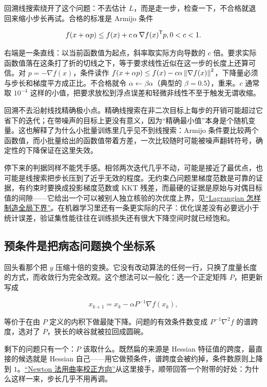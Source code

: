 回溯线搜索绕开了这个问题：不去估计 \(L\)，而是走一步，检查一下，不合格就退回来缩小步长再试。合格的标准是 Armijo 条件

\[
f(x+\alpha p)\le f(x)+c\,\alpha\,\nabla f(x)^{\mathsf{T}}p,
\space 0<c<1 .
\]

右端是一条直线：以当前函数值为起点，斜率取实际方向导数的 \(c\) 倍。要求实际函数值落在这条打了折的切线之下，等于要求线性近似在这一步的长度上还算可信。对 \(p=-\nabla f(x)\)，条件读作 \(f(x+\alpha p)\le f(x)-c\alpha\left\lVert\nabla f(x)\right\rVert^2\)，下降量必须与步长和梯度平方成正比。不合格就令 \(\alpha\leftarrow\beta\alpha\)（典型的 \(\beta=0.5\)），重来。\(c\) 通常取 \(10^{-4}\) 这样的小值，把要求放松到浮点误差和轻微非线性不至于触发无谓收缩。

回溯不去沿射线找精确极小点。精确线搜索在非二次目标上每步的开销可能超过它省下的迭代；在带噪声的目标上更没有意义，因为``精确最小值''本身是个随机变量。这也解释了为什么小批量训练里几乎见不到线搜索：Armijo 条件要比较两个函数值，而小批量给出的函数值带着方差，一次比较随时可能被噪声翻转符号，确定性的下降保证在这里失效。

停下来的判据同样不能凭手感。相邻两次迭代几乎不动，可能是接近了最优点，也可能是线搜索把步长压到了近乎无效的程度。无约束凸问题里梯度范数是可靠的证据，有约束时要换成投影梯度范数或 KKT 残差，而最硬的证据是原始与对偶目标值的间隙——它给出一个可以被别人独立核验的次优度上界，见\hyperref[sec:09-Convex-Optimization/05-Duality/01]{``Lagrangian 怎样制造全局下界''}。在机器学习里还有一条更实际的尺子：优化误差没有必要远小于统计误差，验证集性能往往在训练损失还有很大下降空间时就已经饱和。

\subsection{预条件是把病态问题换个坐标系}

回头看那个把 \(y\) 压缩十倍的变换。它没有改动算法的任何一行，只换了度量长度的方式，而收敛行为完全改观。这个想法可以一般化：选一个正定矩阵 \(P\)，把更新写成

\[
x_{k+1}=x_k-\alpha P^{-1}\nabla f(x_k),
\]

等价于在由 \(P\) 定义的内积下做最陡下降。问题的有效条件数变成 \(P^{-1}\nabla^2f\) 的谱跨度，选对了 \(P\)，狭长的峡谷就被拉回成圆碗。

剩下的问题只有一个：\(P\) 该取什么。既然扁的来源是 Hessian 特征值的跨度，最直接的候选就是 Hessian 自己——用它做预条件，谱跨度会被约掉，条件数原则上降到 \(1\)。\hyperref[sec:09-Convex-Optimization/06-Optimization-Algorithms/02]{``Newton 法用曲率校正方向''}从这里接手，顺带回答一个附带的好处：为什么这样一来，步长几乎不用再调。
